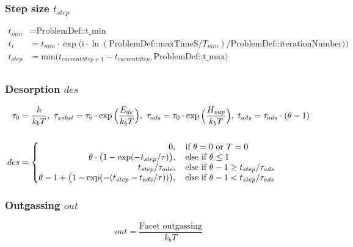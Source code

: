 \subsubsection*{Step size $t_{step}$}
\begin{equation}
	\label{eq:tstep}
	\begin{split}
	t_{min}&=\text{ProblemDef::t\_min}\\
	t_{i}&=t_{min} \cdot \exp\big(\text{i}\cdot \ln(\text{ProblemDef::maxTimeS}/T_{min})/\text{ProblemDef::iterationNumber})\big)\\
	t_{step}&=\text{min}\big(t_{currentStep+1}-t_{currentStep}, \text{ProblemDef::t\_max}\big)\\
	\end{split}
\end{equation}

\subsubsection*{Desorption $des$}
\begin{equation}
	\label{eq:des}
	\begin{split}
	\tau_0&=\frac{h}{k_b T},\ \tau_{subst} =\tau_0 \cdot \exp\Big(\frac{E_{de}}{k_b T}\Big),\ \tau_{ads}=\tau_0 \cdot \exp\Big(\frac{H_{vap}}{k_b T}\Big),\ t_{ads}=\tau_{ads} \cdot (\theta -1)\\
	&\\
	des&=
	\begin{cases}
		\begin{split}
		0&,  \text{\quad if}\ \theta = 0 \ \text{or}\ T=0\\
		\theta \cdot \big(1-\exp(-t_{step}/\tau)\big)&, \text{\quad else if}\ \theta \leq 1\\
		t_{step}/\tau_{ads}&, \text{\quad else if}\ \theta -1 \geq t_{step}/\tau_{ads}\\
		\theta - 1 + \big(1-\exp(-(t_{step}-t_{ads}/\tau))\big)&, \text{\quad else if}\ \theta -1 < t_{step}/\tau_{ads}\\
		\end{split}
	\end{cases}
	\end{split}
\end{equation}

\subsubsection*{Outgassing $out$}
\begin{equation}
	\label{eq:out}
	out=\frac{\text{Facet outgassing}}{k_b T}
\end{equation}


